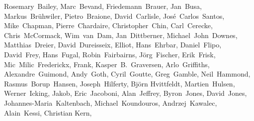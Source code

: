 { \flushleft\small
Rosemary~Bailey,        %
Marc~Bevand,            %
Friedemann~Brauer,      %
Jan~Busa,               %
Markus~Br\"uhwiler,     %
Pietro~Braione,         %
David~Carlisle,         %
Jos\'e~Carlos~Santos,   %
Mike~Chapman,           %
Pierre~Chardaire,       %
Christopher~Chin,       %
Carl~Cerecke,           %
Chris~McCormack,        %
Wim~van~Dam,            %
Jan~Dittberner,         %
Michael~John~Downes,    %
Matthias~Dreier,        %
David~Dureisseix,       %
Elliot,                 %
Hans~Ehrbar,            %
Daniel~Flipo,           %
David~Frey,             %
Hans~Fugal,             %
Robin~Fairbairns,       %
J\"org~Fischer,        %
Erik~Frisk,             %
Mic~Milic~Frederickx,   %
Frank,                  %
Kasper~B.~Graversen,    %
Arlo~Griffiths,         %
Alexandre~Guimond,      %
Andy~Goth,              %
Cyril~Goutte,           %
Greg~Gamble,            %
Neil~Hammond,           %
Rasmus~Borup~Hansen,    %
Joseph~Hilferty,        %
Bj\"orn Hvittfeldt,     %
Martien~Hulsen,         %
Werner~Icking,          %
Jakob,                  %
Eric~Jacoboni,          %
Alan~Jeffrey,           %
Byron~Jones,            %
David~Jones,            %
Johannes-Maria~Kaltenbach, %
Michael~Koundouros,     %
Andrzej~Kawalec,        %
Alain~Kessi,            %
Christian Kern,         %
}

